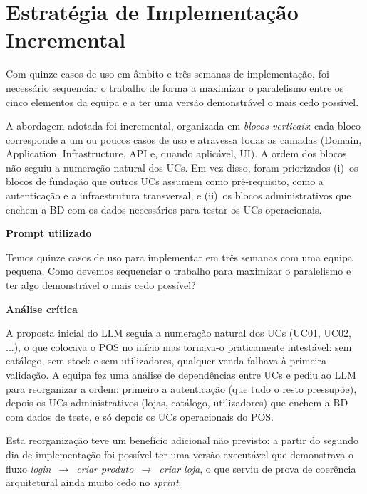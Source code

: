\section{Estratégia de Implementação Incremental}

    Com quinze casos de uso em âmbito e três semanas de implementação, foi necessário sequenciar o trabalho de forma a maximizar o paralelismo entre os cinco elementos da equipa e a ter uma versão demonstrável o mais cedo possível.

    A abordagem adotada foi incremental, organizada em \textit{blocos verticais}: cada bloco corresponde a um ou poucos casos de uso e atravessa todas as camadas (Domain, Application, Infrastructure, API e, quando aplicável, UI). A ordem dos blocos não seguiu a numeração natural dos UCs. Em vez disso, foram priorizados (i)~os blocos de fundação que outros UCs assumem como pré-requisito, como a autenticação e a infraestrutura transversal, e (ii)~os blocos administrativos que enchem a BD com os dados necessários para testar os UCs operacionais.

    \begin{tcolorbox}[title=Interação com o LLM]
    \textbf{Prompt utilizado}

    Temos quinze casos de uso para implementar em três semanas com uma equipa pequena. Como devemos sequenciar o trabalho para maximizar o paralelismo e ter algo demonstrável o mais cedo possível?

    \tcblower

    \textbf{Análise crítica}

    A proposta inicial do LLM seguia a numeração natural dos UCs (UC01, UC02, ...), o que colocava o POS no início mas tornava-o praticamente intestável: sem catálogo, sem stock e sem utilizadores, qualquer venda falhava à primeira validação. A equipa fez uma análise de dependências entre UCs e pediu ao LLM para reorganizar a ordem: primeiro a autenticação (que tudo o resto pressupõe), depois os UCs administrativos (lojas, catálogo, utilizadores) que enchem a BD com dados de teste, e só depois os UCs operacionais do POS.

    Esta reorganização teve um benefício adicional não previsto: a partir do segundo dia de implementação foi possível ter uma versão executável que demonstrava o fluxo \textit{login~$\to$~criar produto~$\to$~criar loja}, o que serviu de prova de coerência arquitetural ainda muito cedo no \textit{sprint}.
    \end{tcolorbox}

